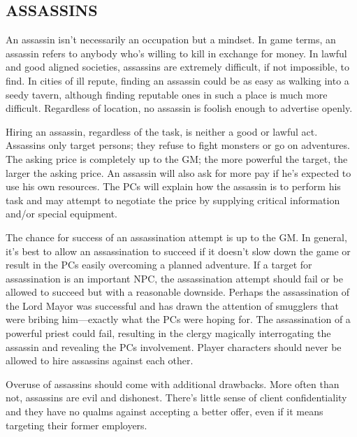 \begin{multicols}{2}
\subsection{ASSASSINS}

An assassin isn't necessarily an occupation but a mindset.  In game terms, an assassin refers to anybody who's willing to kill in exchange for money.  In lawful and good aligned societies, assassins are extremely difficult, if not  impossible, to find.  In cities of ill repute, finding an assassin could be as easy as walking into a seedy tavern, although finding reputable ones in such a place is much more difficult.  Regardless of location, no assassin is foolish enough to advertise openly.

Hiring an assassin, regardless of the task, is neither a good or lawful act.  Assassins only target persons; they refuse to fight monsters or go on adventures.  The asking price is completely up to the GM; the more powerful the target, the larger the asking price.  An assassin will also ask for more pay if he's expected to use his own resources.
The PCs will explain how the assassin is to perform his task and may attempt to negotiate the price by supplying critical information and/or special equipment.
 
The chance for success of an assassination attempt is up to the GM.  In general, it's best to allow an assassination to succeed if it doesn't slow down the game or result in the PCs easily overcoming a planned adventure.  If a target for assassination is an important NPC, the assassination attempt should fail or be allowed to succeed but with a reasonable downside.  Perhaps the assassination of the Lord Mayor was successful and has drawn the attention of smugglers that were bribing him---exactly what the PCs were hoping for.  The assassination of a powerful priest could fail, resulting in the clergy magically interrogating the assassin and revealing the PCs involvement.  Player characters should never be allowed to hire assassins against each other.

Overuse of assassins should come with additional drawbacks.  More often than not, assassins are evil and dishonest.  There's little sense of client confidentiality and they have no qualms against accepting a better offer, even if it means targeting their former employers. 

\end{multicols}

